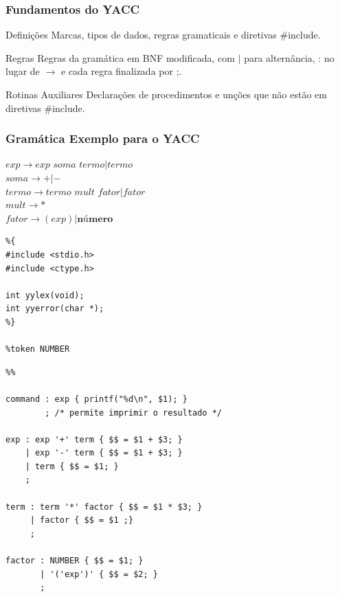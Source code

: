 \documentclass[table]{beamer}
\begin{document}
\begin{frame}
   \frametitle{Fundamentos do YACC}
   \begin{block}{Definições}
   Marcas, tipos de dados, regras gramaticais e diretivas \#include.
   \end{block}

   \begin{block}{Regras}
   Regras da gramática em BNF modificada, com $|$ para alternância, : no lugar de $\to$ e cada regra finalizada por ;.
   \end{block}
   
   \begin{block}{Rotinas Auxiliares}
   Declarações de procedimentos e unções que não estão em diretivas \#include.
   \end{block}
\end{frame}

\begin{frame}
   \frametitle{Gramática Exemplo para o YACC}
   $exp\to\textit{exp soma termo}|termo$ \\
   $soma\to+|-$ \\
   $termo\to\textit{termo mult fator}|fator$ \\
   $mult\to *$ \\
   $fator\to(exp)|\textbf{número}$
\end{frame}

\begin{frame}[fragile]
   \begin{verbatim}
%{
#include <stdio.h>
#include <ctype.h>

int yylex(void);
int yyerror(char *);
%}

%token NUMBER
  \end{verbatim}
\end{frame}

\begin{frame}[fragile]
   \begin{verbatim}
%%

command : exp { printf("%d\n", $1); }
        ; /* permite imprimir o resultado */

exp : exp '+' term { $$ = $1 + $3; }
    | exp '-' term { $$ = $1 + $3; }
    | term { $$ = $1; }
    ;
 
term : term '*' factor { $$ = $1 * $3; }
     | factor { $$ = $1 ;} 
     ;

factor : NUMBER { $$ = $1; }
       | '('exp')' { $$ = $2; }
       ;

   \end{verbatim}
\end{frame}
\end{document}
